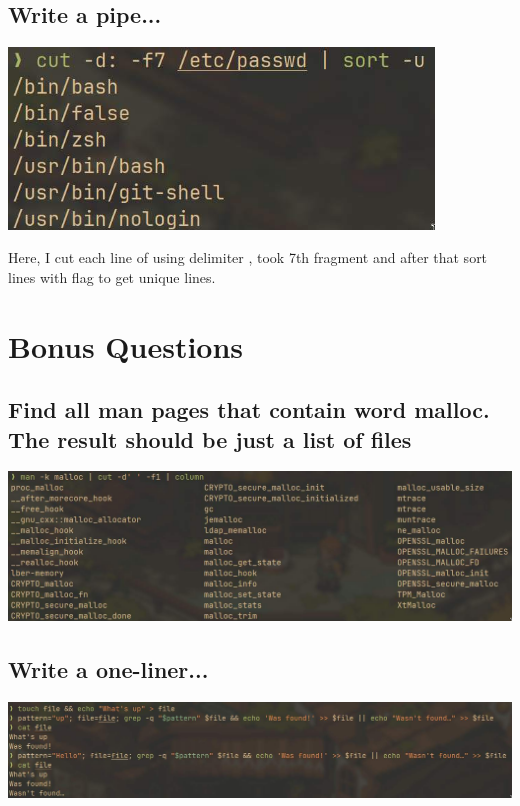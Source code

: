 \documentclass{article}
\begin{document}
\subsection{Write a pipe...}
\noindent

\includegraphics[width=320pt]{pipe-2.jpg}

Here, I cut each line of  using delimiter \codeword{:}, took 7th fragment and after that sort lines with  flag to get unique lines.

\section{Bonus Questions}

\subsection{Find all man pages that contain word malloc. The result should be just a list of files}
\noindent

\includegraphics[width=480pt]{man.jpg}

\subsection{Write a one-liner...}
\noindent

\includegraphics[width=480pt]{liner.jpg}
\end{document}
